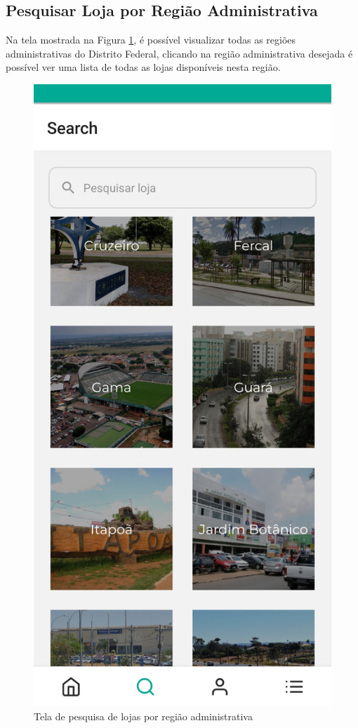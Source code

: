 \subsection{Pesquisar Loja por Região Administrativa}
Na tela mostrada na Figura \ref{tela-pesquisa-loja-regiao-app}, é possível visualizar todas as regiões administrativas do Distrito Federal, clicando na região administrativa desejada é possível ver uma lista de todas as lojas disponíveis nesta região.

\begin{figure}[h]
	\centering
	\includegraphics[keepaspectratio=true,scale=0.16]{figuras/filtro_loja_regiao.jpg}
	\caption{Tela de pesquisa de lojas por região administrativa}
        \label{tela-pesquisa-loja-regiao-app}
\end{figure}

